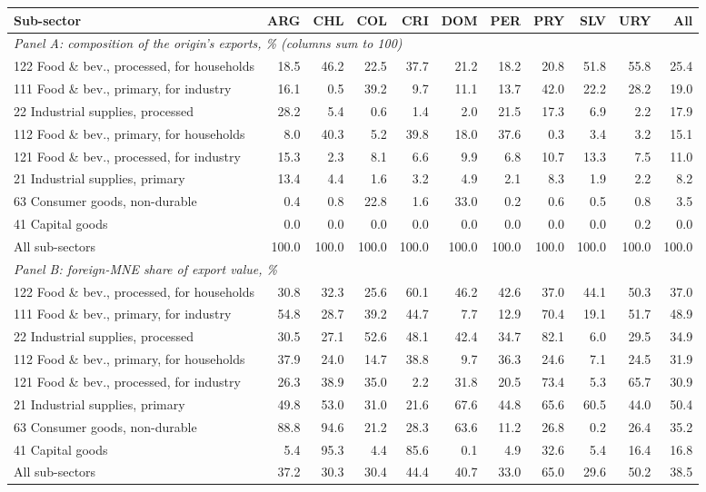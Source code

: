 \begin{tabular}{lrrrrrrrrrr}
\toprule
Sub-sector & ARG & CHL & COL & CRI & DOM & PER & PRY & SLV & URY & All \\
\midrule
\multicolumn{11}{l}{\textit{Panel A: composition of the origin's exports, \% (columns sum to 100)}} \\
122 Food \& bev., processed, for households & 18.5 & 46.2 & 22.5 & 37.7 & 21.2 & 18.2 & 20.8 & 51.8 & 55.8 & 25.4 \\
111 Food \& bev., primary, for industry & 16.1 & 0.5 & 39.2 & 9.7 & 11.1 & 13.7 & 42.0 & 22.2 & 28.2 & 19.0 \\
22 Industrial supplies, processed & 28.2 & 5.4 & 0.6 & 1.4 & 2.0 & 21.5 & 17.3 & 6.9 & 2.2 & 17.9 \\
112 Food \& bev., primary, for households & 8.0 & 40.3 & 5.2 & 39.8 & 18.0 & 37.6 & 0.3 & 3.4 & 3.2 & 15.1 \\
121 Food \& bev., processed, for industry & 15.3 & 2.3 & 8.1 & 6.6 & 9.9 & 6.8 & 10.7 & 13.3 & 7.5 & 11.0 \\
21 Industrial supplies, primary & 13.4 & 4.4 & 1.6 & 3.2 & 4.9 & 2.1 & 8.3 & 1.9 & 2.2 & 8.2 \\
63 Consumer goods, non-durable & 0.4 & 0.8 & 22.8 & 1.6 & 33.0 & 0.2 & 0.6 & 0.5 & 0.8 & 3.5 \\
41 Capital goods & 0.0 & 0.0 & 0.0 & 0.0 & 0.0 & 0.0 & 0.0 & 0.0 & 0.2 & 0.0 \\
All sub-sectors & 100.0 & 100.0 & 100.0 & 100.0 & 100.0 & 100.0 & 100.0 & 100.0 & 100.0 & 100.0 \\
\midrule
\multicolumn{11}{l}{\textit{Panel B: foreign-MNE share of export value, \%}} \\
122 Food \& bev., processed, for households & 30.8 & 32.3 & 25.6 & 60.1 & 46.2 & 42.6 & 37.0 & 44.1 & 50.3 & 37.0 \\
111 Food \& bev., primary, for industry & 54.8 & 28.7 & 39.2 & 44.7 & 7.7 & 12.9 & 70.4 & 19.1 & 51.7 & 48.9 \\
22 Industrial supplies, processed & 30.5 & 27.1 & 52.6 & 48.1 & 42.4 & 34.7 & 82.1 & 6.0 & 29.5 & 34.9 \\
112 Food \& bev., primary, for households & 37.9 & 24.0 & 14.7 & 38.8 & 9.7 & 36.3 & 24.6 & 7.1 & 24.5 & 31.9 \\
121 Food \& bev., processed, for industry & 26.3 & 38.9 & 35.0 & 2.2 & 31.8 & 20.5 & 73.4 & 5.3 & 65.7 & 30.9 \\
21 Industrial supplies, primary & 49.8 & 53.0 & 31.0 & 21.6 & 67.6 & 44.8 & 65.6 & 60.5 & 44.0 & 50.4 \\
63 Consumer goods, non-durable & 88.8 & 94.6 & 21.2 & 28.3 & 63.6 & 11.2 & 26.8 & 0.2 & 26.4 & 35.2 \\
41 Capital goods & 5.4 & 95.3 & 4.4 & 85.6 & 0.1 & 4.9 & 32.6 & 5.4 & 16.4 & 16.8 \\
All sub-sectors & 37.2 & 30.3 & 30.4 & 44.4 & 40.7 & 33.0 & 65.0 & 29.6 & 50.2 & 38.5 \\
\bottomrule
\end{tabular}

